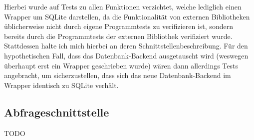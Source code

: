 Hierbei wurde auf Tests zu allen Funktionen verzichtet, welche lediglich einen Wrapper um SQLite darstellen, da die
Funktionalität von externen Bibliotheken üblicherweise nicht durch eigene Programmtests zu verifizieren ist, sondern
bereits durch die Programmtests der externen Bibliothek verifiziert wurde. Stattdessen halte ich mich hierbei an deren
Schnittstellenbeschreibung.
Für den hypothetischen Fall, dass das Datenbank-Backend ausgetauscht wird (weswegen überhaupt erst ein Wrapper
geschrieben wurde) wären dann allerdings Tests angebracht, um sicherzustellen, dass sich das neue Datenbank-Backend im
Wrapper identisch zu SQLite verhält.

\subsection{Abfrageschnittstelle}
TODO